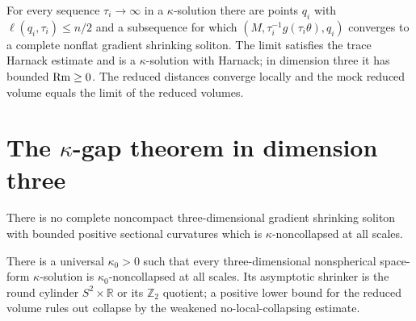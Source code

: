 \begin{theorem}
\label{thm:chow-iii-asymptotic-shrinker}
For every sequence $\tau_i\to\infty$ in a $\kappa$-solution there are points
$q_i$ with $\ell(q_i,\tau_i)\le n/2$ and a subsequence for which
$(M,\tau_i^{-1}g(\tau_i\theta),q_i)$ converges to a complete nonflat gradient
shrinking soliton.  The limit satisfies the trace Harnack estimate and is a
$\kappa$-solution with Harnack; in dimension three it has bounded
$\operatorname{Rm}\ge0$.  The reduced distances converge locally and the mock reduced volume
equals the limit of the reduced volumes.
\end{theorem}

\section{\texorpdfstring{The $\kappa$-gap theorem in dimension three}{The Kappa-gap theorem in dimension three}}

\begin{theorem}
\label{thm:chow-iii-no-3d-shrinker}
There is no complete noncompact three-dimensional gradient shrinking soliton
with bounded positive sectional curvatures which is $\kappa$-noncollapsed at
all scales.
\end{theorem}

\begin{theorem}
\label{thm:chow-iii-kappa-gap}
There is a universal $\kappa_0>0$ such that every three-dimensional
nonspherical space-form $\kappa$-solution is $\kappa_0$-noncollapsed at all
scales.  Its asymptotic shrinker is the round cylinder $S^2\times\mathbb R$
or its $\mathbb Z_2$ quotient; a positive lower bound for the reduced volume
rules out collapse by the weakened no-local-collapsing estimate.
\end{theorem}

